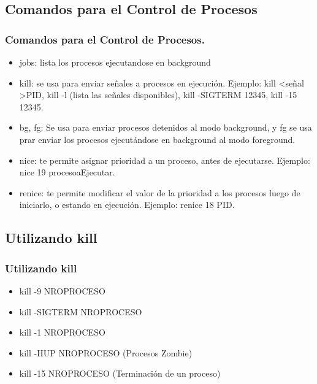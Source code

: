 \documentclass{beamer}
\begin{document}
\subsection{Comandos para el Control de Procesos}
\begin{frame}
\frametitle{Comandos para el Control de Procesos.}
\begin{itemize}
\item jobs: lista los procesos ejecutandose en background
\item kill: se usa para enviar se\~nales a procesos en ejecuci\'on. Ejemplo: kill \textless se\~nal \textgreater PID, kill -l (lista las se\~nales disponibles), kill -SIGTERM 12345, kill -15 12345.
\item bg, fg: Se usa para enviar procesos detenidos al modo background, y fg se usa prar enviar los procesos ejecut\'andose en background al modo foreground.
\item nice: te permite asignar prioridad a un proceso, antes de ejecutarse. Ejemplo: nice 19 procesoaEjecutar.
\item renice:  te permite modificar el valor de la prioridad a los procesos luego de iniciarlo, o estando en ejecuci\'on. Ejemplo:  renice 18 PID.
\end{itemize}
\end{frame}

\subsection{Utilizando kill}
\begin{frame}
\frametitle{Utilizando kill}
\begin{itemize}
\item kill -9 NROPROCESO
\item kill -SIGTERM NROPROCESO
\item kill -1 NROPROCESO
\item kill -HUP NROPROCESO (Procesos Zombie)
\item kill -15 NROPROCESO (Terminaci\'on de un proceso)
\end{itemize}
\end{frame}
\end{document}
